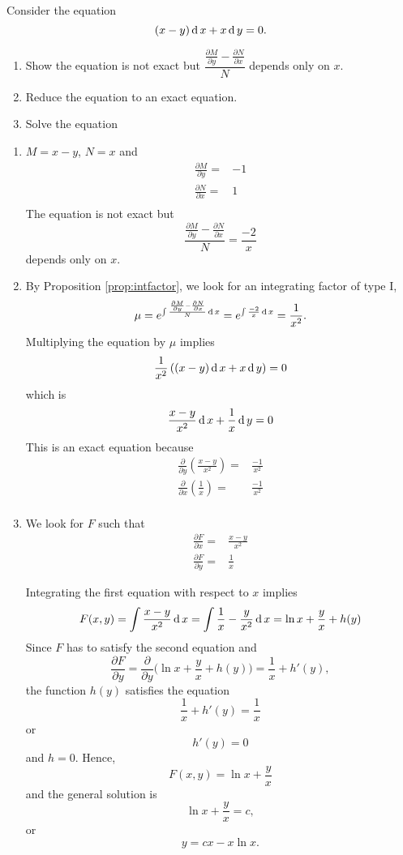 \begin{exercise}
	Consider the equation
	\[ (x-y)  \operatorname{d} x +  x \operatorname{d} y =0. \]
	\begin{enumerate}
		\item  Show the equation is not exact but $\dfrac{\frac{\partial M}{\partial y} - \frac{\partial N}{\partial x}}{N}$ depends only on $x$.
		\item Reduce the equation to an exact equation.
		\item Solve the equation
	\end{enumerate}
\end{exercise}
\begin{exersol}
	\begin{enumerate}
		\item $M=x-y$, $N=x$ and 
		\[
		\begin{split}
		\frac{\partial M}{\partial y}=&-1 \\
		\frac{\partial N}{\partial x}=&1 \\
		\end{split}
		\]
		The equation is not exact but
		\[\frac{\frac{\partial M}{\partial y} - \frac{\partial N}{\partial x}}{N}=  \frac{-2}{x}\] 
		depends only on $x$.
		\item By Proposition \ref{prop:intfactor}, 
			we look for an integrating factor of type I, 
		\[\mu = e^{\int \frac{\frac{\partial M}{\partial y} - \frac{\partial N}{\partial x}}{N}\operatorname{d} x} = e^{\int  \frac{-2}{x}\operatorname{d} x} = \frac{1}{x^2}. \]
		Multiplying the equation by $\mu$ implies
		\[ \frac{1}{x^2}\left((x- y)  \operatorname{d} x +  x \operatorname{d} y \right)= 0  \]
		which is 
		\[  \frac{x-y}{x^2}  \operatorname{d} x+  \frac{1}{x} \operatorname{d} y= 0  \]
		This is an exact equation because
		\[
		\begin{split}
		\frac{\partial}{\partial y} \left(  \frac{x-y}{x^2} \right) =&\frac{-1}{x^2} \\
		\frac{\partial}{\partial x} \left(\frac{1}{x}\right)=&\frac{-1}{x^2} \\
		\end{split}
		\]
		\item 
		We look for $F$ such that
		\[
		\begin{split}
		\frac{\partial F}{\partial x} =& \frac{x-y}{x^2}\\
		\frac{\partial F}{\partial y}  =& \frac{1}{x}
		\end{split}
		\]
		
		Integrating the first equation with respect to $x$ implies
		\[  
		F(x, y) = \int  \frac{x-y}{x^2} \operatorname{d} x =\int  \frac{1}{x}-\frac{y}{x^2} \operatorname{d} x =\ln x+ \frac{y}{x} + h(y)
		\]
		Since $F$ has to satisfy the second equation and 
		\[
		\frac{\partial F}{\partial y} = \frac{\partial}{\partial y} \bigg(\ln x+ \frac{y}{x} + h(y)\bigg) = \frac{1}{x} + h'(y),
		\]
		the function $h(y)$ satisfies the equation
		\[\frac{1}{x} + h'(y) =\frac{1}{x} \]
		or 
		\[ h'(y) =0 \]
		and $h=0$. Hence, 
		\[
		F(x, y)=\ln x + \frac{y}{x}
		\]
		and the general solution is 
		\[
		\ln x + \frac{y}{x} = c,
		\]
    or
    \[y=cx-x\ln x.\]
	\end{enumerate}
\end{exersol}

